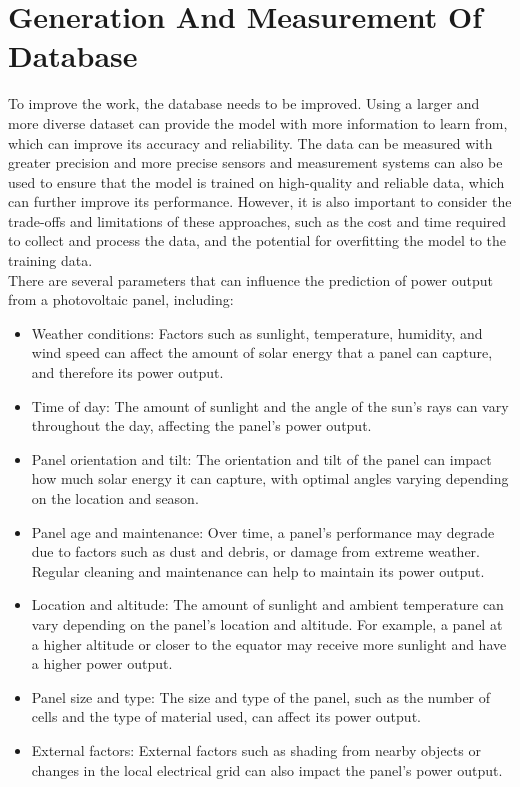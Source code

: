 \documentclass{report}
\begin{document}
\section{Generation And Measurement Of Database}
To improve the work, the database needs to be improved. Using a larger and more diverse dataset can provide the model with more information to learn from, which can improve its accuracy and reliability. The data can be measured with greater precision and more precise sensors and measurement systems can also be used to ensure that the model is trained on high-quality and reliable data, which can further improve its performance. However, it is also important to consider the trade-offs and limitations of these approaches, such as the cost and time required to collect and process the data, and the potential for overfitting the model to the training data.\\
There are several parameters that can influence the prediction of power output from a photovoltaic panel, including:
\begin{itemize}
    \item Weather conditions: Factors such as sunlight, temperature, humidity, and wind speed can affect the amount of solar energy that a panel can capture, and therefore its power output.
    \item Time of day: The amount of sunlight and the angle of the sun's rays can vary throughout the day, affecting the panel's power output.
    \item Panel orientation and tilt: The orientation and tilt of the panel can impact how much solar energy it can capture, with optimal angles varying depending on the location and season.
    \item Panel age and maintenance: Over time, a panel's performance may degrade due to factors such as dust and debris, or damage from extreme weather. Regular cleaning and maintenance can help to maintain its power output.
    \item Location and altitude: The amount of sunlight and ambient temperature can vary depending on the panel's location and altitude. For example, a panel at a higher altitude or closer to the equator may receive more sunlight and have a higher power output.
    \item Panel size and type: The size and type of the panel, such as the number of cells and the type of material used, can affect its power output.
    \item External factors: External factors such as shading from nearby objects or changes in the local electrical grid can also impact the panel's power output.
\end{itemize}
\end{document}

